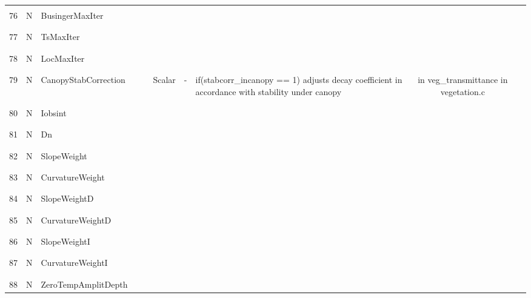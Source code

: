 \begin{longtable}{|c|c|l|c|c|c|c|p{}|c|p{}|}
&&&&&&&&&\\\hline%
&&&&&&&&&\\
76 & N & BusingerMaxIter & & & & & & & \\
&&&&&&&&&\\\hline%
&&&&&&&&&\\
77 & N & TsMaxIter & & & & & & & \\
&&&&&&&&&\\\hline%
&&&&&&&&&\\
78 & N & LocMaxIter & & & & & & & \\
&&&&&&&&&\\\hline%
&&&&&&&&&\\
79 & N & CanopyStabCorrection & & & Scalar & - & \parbox[c]{\hsize}{if(stabcorr\_incanopy == 1) adjusts decay coefficient in accordance with stability under canopy} & in  veg\_transmittance in vegetation.c & \\
&&&&&&&&&\\\hline%
&&&&&&&&&\\
80 & N & Iobsint & & & & & & & \\
&&&&&&&&&\\\hline%
&&&&&&&&&\\
81 & N & Dn & & & & & & & \\
&&&&&&&&&\\\hline%
&&&&&&&&&\\
82 & N & SlopeWeight & & & & & & & \\
&&&&&&&&&\\\hline%
&&&&&&&&&\\
83 & N & CurvatureWeight & & & & & & & \\
&&&&&&&&&\\\hline%
&&&&&&&&&\\
84 & N & SlopeWeightD & & & & & & & \\
&&&&&&&&&\\\hline%
&&&&&&&&&\\
85 & N & CurvatureWeightD & & & & & & & \\
&&&&&&&&&\\\hline%
&&&&&&&&&\\
86 & N & SlopeWeightI & & & & & & & \\
&&&&&&&&&\\\hline%
&&&&&&&&&\\
87 & N & CurvatureWeightI & & & & & & & \\
&&&&&&&&&\\\hline%
&&&&&&&&&\\
88 & N & ZeroTempAmplitDepth & & & & & & & \\

\end{longtable}
